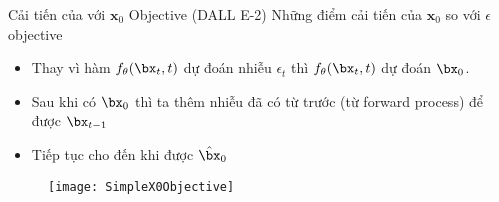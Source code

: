 
\begin{frame}{Cải tiến của  với $\mathbf{x}_0$ Objective (DALL E-2)}
	Những điểm cải tiến của $\mathbf{x}_0$ so với $\epsilon$ objective
	\begin{itemize}
		\item Thay vì hàm $f_{\theta}(\bx_t, t)$ dự đoán nhiễu $\epsilon_t$ thì  $f_{\theta}(\bx_t, t)$ dự đoán $\bx_0$.
		\item Sau khi có $\bx_0$ thì ta thêm nhiễu đã có từ trước (từ forward process) để được $\bx_{t-1}$
		\item Tiếp tục cho đến khi được $\hat{\bx}_0$
		
	\end{itemize} 
	
	\begin{figure}
		\centering
		\texttt{[image: SimpleX0Objective]}
	\end{figure}
	
\end{frame}

